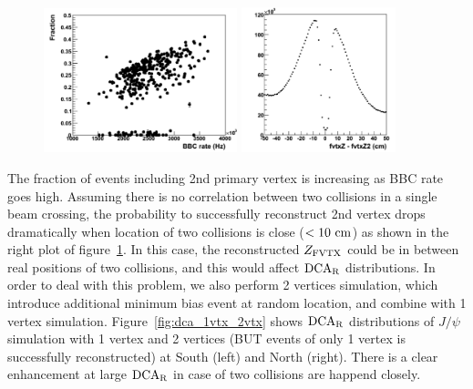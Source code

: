 \documentclass[12pt]{article}
\newcommand{\jpsi}{$J/\psi$ }
\newcommand{\dcar}{$\rm{DCA}_{R}$ }
\newcommand{\fvtxz}{$Z_{\rm FVTX}$ }
\begin{document}
\begin{figure}[!h]
\begin{center}
\includegraphics[width=0.5\textwidth,angle=0]{figures/Fraction_2nd_vertex_BBCrate}
\includegraphics[width=0.4\textwidth,angle=0]{figures/FvtxZ_diff_1st_2nd}
\\ \caption{}
\label{fig:FvtxZ_2nd}
\end{center}
\end{figure}


The fraction of events including 2nd primary vertex is increasing as BBC rate goes high.
Assuming there is no correlation between two collisions in a single beam crossing, the probability to successfully reconstruct 2nd vertex drops dramatically when location of two collisions is close ($<10~{\rm cm}$) as shown in the right plot of figure~\ref{fig:FvtxZ_2nd}.
In this case, the reconstructed \fvtxz could be in between real positions of two collisions, and this would affect \dcar distributions.
In order to deal with this problem, we also perform 2 vertices simulation, which introduce additional minimum bias event at random location, and combine with 1 vertex simulation.
Figure~\ref{fig:dca_1vtx_2vtx} shows \dcar distributions of \jpsi simulation with 1 vertex and 2 vertices (BUT events of only 1 vertex is successfully reconstructed) at South (left) and North (right).
There is a clear enhancement at large \dcar in case of two collisions are happend closely.
\end{document}
